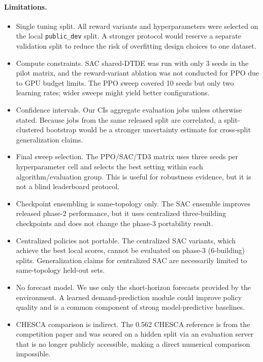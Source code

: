 \documentclass{article}
\begin{document}
\paragraph{Limitations.}
\begin{itemize}
    \item Single tuning split. All reward variants and hyperparameters were selected on the local \texttt{public\_dev} split. A stronger protocol would reserve a separate validation split to reduce the risk of overfitting design choices to one dataset.
    \item Compute constraints. SAC shared-DTDE was run with only 3 seeds in the pilot matrix, and the reward-variant ablation was not conducted for PPO due to GPU budget limits. The PPO sweep covered 10 seeds but only two learning rates; wider sweeps might yield better configurations.
    \item Confidence intervals. Our CIs aggregate evaluation jobs unless otherwise stated. Because jobs from the same released split are correlated, a split-clustered bootstrap would be a stronger uncertainty estimate for cross-split generalization claims.
    \item Final sweep selection. The PPO/SAC/TD3 matrix uses three seeds per hyperparameter cell and selects the best setting within each algorithm/evaluation group. This is useful for robustness evidence, but it is not a blind leaderboard protocol.
    \item Checkpoint ensembling is same-topology only. The SAC ensemble improves released phase-2 performance, but it uses centralized three-building checkpoints and does not change the phase-3 portability result.
    \item Centralized policies not portable. The centralized SAC variants, which achieve the best local scores, cannot be evaluated on phase-3 (6-building) splits. Generalization claims for centralized SAC are necessarily limited to same-topology held-out sets.
    \item No forecast model. We use only the short-horizon forecasts provided by the environment. A learned demand-prediction module could improve policy quality and is a common component of strong model-predictive baselines.
    \item CHESCA comparison is indirect. The 0.562 CHESCA reference is from the competition paper \citep{pinto2024citylearn} and was scored on a hidden split via an evaluation server that is no longer publicly accessible, making a direct numerical comparison impossible.
\end{itemize}
\end{document}
